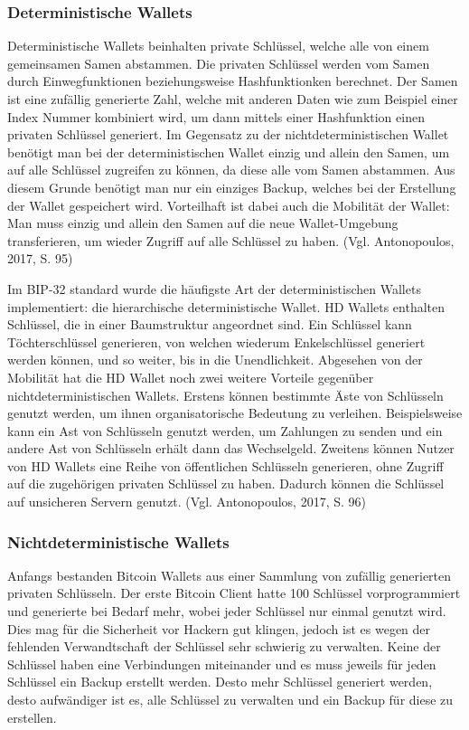 \subsubsection{Deterministische Wallets}
Deterministische Wallets beinhalten private Schlüssel, welche alle von einem gemeinsamen Samen abstammen. Die privaten Schlüssel
werden vom Samen durch Einwegfunktionen beziehungsweise Hashfunktionken berechnet. Der Samen ist eine zufällig generierte Zahl,
welche mit anderen Daten wie zum Beispiel einer Index Nummer kombiniert wird, um dann mittels einer Hashfunktion einen privaten
Schlüssel generiert. Im Gegensatz zu der nichtdeterministischen Wallet benötigt man bei der deterministischen Wallet einzig und 
allein den Samen, um auf alle Schlüssel zugreifen zu können, da diese alle vom Samen abstammen. Aus diesem Grunde benötigt man
nur ein einziges Backup, welches bei der Erstellung der Wallet gespeichert wird. Vorteilhaft ist dabei auch die Mobilität der
Wallet: Man muss einzig und allein den Samen auf die neue Wallet-Umgebung transferieren, um wieder Zugriff auf alle Schlüssel
zu haben. (Vgl. Antonopoulos, 2017, S. 95)

Im BIP-32 standard wurde die häufigste Art der deterministischen Wallets implementiert: die hierarchische deterministische Wallet.
HD Wallets enthalten Schlüssel, die in einer Baumstruktur angeordnet sind. Ein Schlüssel kann Töchterschlüssel generieren, von 
welchen wiederum Enkelschlüssel generiert werden können, und so weiter, bis in die Unendlichkeit. Abgesehen von der Mobilität
hat die HD Wallet noch zwei weitere Vorteile gegenüber nichtdeterministischen Wallets. Erstens können bestimmte Äste von
Schlüsseln genutzt werden, um ihnen organisatorische Bedeutung zu verleihen. Beispielsweise kann ein Ast von Schlüsseln genutzt
werden, um Zahlungen zu senden und ein andere Ast von Schlüsseln erhält dann das Wechselgeld. Zweitens können Nutzer von HD
Wallets eine Reihe von öffentlichen Schlüsseln generieren, ohne Zugriff auf die zugehörigen privaten Schlüssel zu haben. Dadurch 
können die Schlüssel auf unsicheren Servern genutzt. (Vgl. Antonopoulos, 2017, S. 96)


\subsubsection{Nichtdeterministische Wallets}
Anfangs bestanden Bitcoin Wallets aus einer Sammlung von zufällig generierten privaten Schlüsseln. Der erste Bitcoin Client
hatte 100 Schlüssel vorprogrammiert und generierte bei Bedarf mehr, wobei jeder Schlüssel nur einmal genutzt wird. Dies mag
für die Sicherheit vor Hackern gut klingen, jedoch ist es wegen der fehlenden Verwandtschaft der Schlüssel sehr schwierig
zu verwalten. Keine der Schlüssel haben eine Verbindungen miteinander und es muss jeweils für jeden Schlüssel ein Backup
erstellt werden. Desto mehr Schlüssel generiert werden, desto aufwändiger ist es, alle Schlüssel zu verwalten und ein Backup
für diese zu erstellen.


